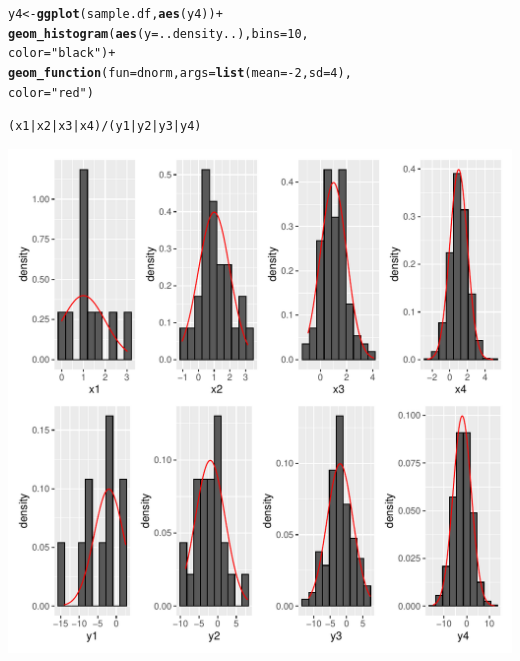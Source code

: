 \documentclass{article}\usepackage[]{graphicx}\usepackage[]{color}
\makeatletter
\def\maxwidth{ %
  \ifdim\Gin@nat@width>\linewidth
    \linewidth
  \else
    \Gin@nat@width
  \fi
}
\newcommand{\hlnum}[1]{\textcolor[rgb]{0.686,0.059,0.569}{#1}}%
\newcommand{\hlstr}[1]{\textcolor[rgb]{0.192,0.494,0.8}{#1}}%
\newcommand{\hlopt}[1]{\textcolor[rgb]{0,0,0}{#1}}%
\newcommand{\hlstd}[1]{\textcolor[rgb]{0.345,0.345,0.345}{#1}}%
\newcommand{\hlkwb}[1]{\textcolor[rgb]{0.69,0.353,0.396}{#1}}%
\newcommand{\hlkwc}[1]{\textcolor[rgb]{0.333,0.667,0.333}{#1}}%
\newcommand{\hlkwd}[1]{\textcolor[rgb]{0.737,0.353,0.396}{\textbf{#1}}}%
\newenvironment{kframe}{%
 \def\at@end@of@kframe{}%
 \ifinner\ifhmode%
  \def\at@end@of@kframe{\end{minipage}}%
  \begin{minipage}{\columnwidth}%
 \fi\fi%
 \def\FrameCommand##1{\hskip\@totalleftmargin \hskip-\fboxsep
 \colorbox{shadecolor}{##1}\hskip-\fboxsep
     \hskip-\linewidth \hskip-\@totalleftmargin \hskip\columnwidth}%
 \MakeFramed {\advance\hsize-\width
   \@totalleftmargin\z@ \linewidth\hsize
   \@setminipage}}%
 {\par\unskip\endMakeFramed%
 \at@end@of@kframe}
\newenvironment{knitrout}{}{} %
\makeatother
\begin{document}
\begin{enumerate}
\begin{enumerate}
\begin{knitrout}
\begin{kframe}
\begin{alltt}
        \hlstd{y4}\hlkwb{<-}\hlkwd{ggplot}\hlstd{(sample.df,} \hlkwd{aes}\hlstd{(y4))}\hlopt{+}
          \hlkwd{geom_histogram}\hlstd{(}\hlkwd{aes}\hlstd{(}\hlkwc{y}\hlstd{=..density..),} \hlkwc{bins}\hlstd{=}\hlnum{10}\hlstd{,}
                         \hlkwc{color}\hlstd{=}\hlstr{"black"}\hlstd{)}\hlopt{+}
\hlkwd{geom_function}\hlstd{(}\hlkwc{fun}\hlstd{=dnorm,} \hlkwc{args} \hlstd{=} \hlkwd{list}\hlstd{(}\hlkwc{mean} \hlstd{=} \hlopt{-}\hlnum{2}\hlstd{,} \hlkwc{sd} \hlstd{=} \hlnum{4}\hlstd{),}
              \hlkwc{color}\hlstd{=}\hlstr{"red"}\hlstd{)}


        \hlstd{(x1}\hlopt{|}\hlstd{x2}\hlopt{|}\hlstd{x3}\hlopt{|}\hlstd{x4)}\hlopt{/}\hlstd{(y1}\hlopt{|}\hlstd{y2}\hlopt{|}\hlstd{y3}\hlopt{|}\hlstd{y4)}
\end{alltt}
\end{kframe}
\includegraphics[width=\maxwidth]{figure/unnamed-chunk-5-1} 
\end{knitrout}
	\end{enumerate}

\end{enumerate}
\end{document}
